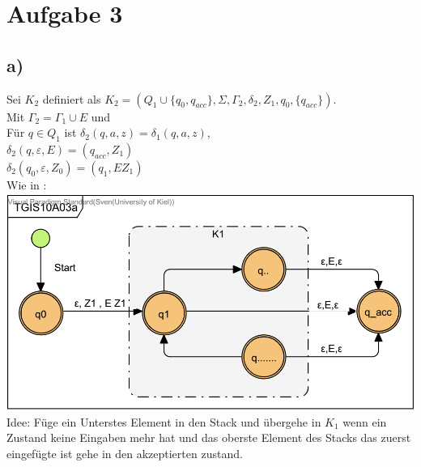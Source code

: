 \section*{Aufgabe 3}

\subsection*{a)}
Sei $K_2$ definiert als $K_2=(Q_1 \cup \{ q_0, q_{acc}\} , \Sigma , \Gamma_2 , \delta_2 , Z_1, q_0, \{ q_{acc} \} )$.\\
 Mit $\Gamma_2 = \Gamma_1 \cup {E}$ und\\
Für $q \in Q_1$ ist $\delta_2 (q,a,z) = \delta_1 (q,a,z) $, \\
 $\delta_2 (q,\varepsilon ,E) = (q_{acc}, Z_1) $ \\
 $\delta_2 (q_0,\varepsilon ,Z_0) = (q_1, E Z_1) $\\
 Wie in :\\
\includegraphics[width=\textwidth]{part/TGIS10A03a}\\
Idee:
Füge ein Unterstes Element in den Stack und übergehe in $K_1$ wenn ein Zustand keine Eingaben mehr hat und das oberste Element des Stacks das zuerst eingefügte ist gehe in  den akzeptierten zustand.



